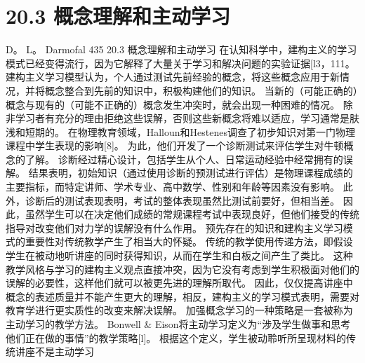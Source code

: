 \documentclass[UTF8,11pt,a4paper,openany,fontset=fandol]{ctexbook}
\begin{document}
\section{20.3 概念理解和主动学习}
D。 L。 Darmofal 435 20.3 概念理解和主动学习 在认知科学中，建构主义的学习模式已经变得流行，因为它解释了大量关于学习和解决问题的实验证据[l3，111。 建构主义学习模型认为，个人通过测试先前经验的概念，将这些概念应用于新情况，并将概念整合到先前的知识中，积极构建他们的知识。 当新的（可能正确的）概念与现有的（可能不正确的）概念发生冲突时，就会出现一种困难的情况。 除非学习者有充分的理由拒绝这些误解，否则这些新概念将难以适应，学习通常是肤浅和短期的。 在物理教育领域，Halloun和Hestenes调查了初步知识对第一门物理课程中学生表现的影响[8]。 为此，他们开发了一个诊断测试来评估学生对牛顿概念的了解。 诊断经过精心设计，包括学生从个人、日常运动经验中经常拥有的误解。 结果表明，初始知识（通过使用诊断的预测试进行评估）是物理课程成绩的主要指标，而特定讲师、学术专业、高中数学、性别和年龄等因素没有影响。 此外，诊断后的测试表现表明，考试的整体表现虽然比测试前要好，但相当差。 因此，虽然学生可以在决定他们成绩的常规课程考试中表现良好，但他们接受的传统指导对改变他们对力学的误解没有什么作用。 预先存在的知识和建构主义学习模式的重要性对传统教学产生了相当大的怀疑。 传统的教学使用传递方法，即假设学生在被动地听讲座的同时获得知识，从而在学生和白板之间产生了类比。 这种教学风格与学习的建构主义观点直接冲突，因为它没有考虑到学生积极面对他们的误解的必要性，这样他们就可以被更先进的理解所取代。 因此，仅仅提高讲座中概念的表述质量并不能产生更大的理解，相反，建构主义的学习模式表明，需要对教育学进行更实质性的改变来解决误解。 加强概念学习的一种策略是一套被称为主动学习的教学方法。 Bonwell \& Eison将主动学习定义为“涉及学生做事和思考他们正在做的事情”的教学策略[l]。 根据这个定义，学生被动聆听所呈现材料的传统讲座不是主动学习
\end{document}
